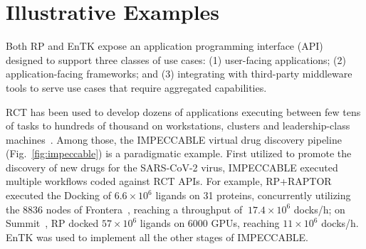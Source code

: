 \documentclass[preprint,12pt, a4paper]{elsarticle}
\begin{document}
\section{Illustrative Examples}\label{sec:examples}




Both RP and EnTK expose an application programming interface
(API)~\cite{rp-api-url,entk-api-url} designed to support three classes of use
cases: (1) user-facing applications; (2) application-facing frameworks; and (3)
integrating with third-party middleware tools to serve use cases that require
aggregated capabilities.

RCT has been used to develop dozens of applications executing between few tens
of tasks to hundreds of thousand on workstations, clusters and leadership-class
machines~\cite{radical-list-pub}. Among those, the IMPECCABLE virtual drug
discovery pipeline~\cite{saadi2021impeccable} (Fig.~\ref{fig:impeccable}) is a
paradigmatic example. First utilized to promote the discovery of new drugs for
the SARS-CoV-2 virus, IMPECCABLE executed multiple workflows coded against RCT
APIs. For example, RP+RAPTOR executed the Docking of $6.6\times10^6$ ligands on
31 proteins, concurrently utilizing the 8836 nodes of
Frontera~\cite{stanzione2020frontera}, reaching a throughput of
$~17.4\times10^6$ docks/h; on Summit~\cite{luo2020pre}, RP docked $57\times10^6$
ligands on 6000 GPUs, reaching $11\times10^6$ docks/h. EnTK was used to
implement all the other stages of IMPECCABLE\@.
\end{document}

